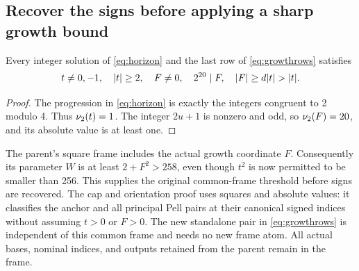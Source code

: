 \subsection{Recover the signs before applying a sharp growth bound}

\begin{lemma}\label{lem:preliminary}
Every integer solution of \eqref{eq:horizon} and the last row of
\eqref{eq:growthrows} satisfies
\[
 t\ne0,-1,\quad \lvert t\rvert\ge2,\quad F\ne0,\quad
 2^{20}\mid F,\quad \lvert F\rvert\ge d\lvert t\rvert>\lvert t\rvert.
\]
\end{lemma}
\begin{proof}
The progression in \eqref{eq:horizon} is exactly the integers congruent to
2 modulo 4. Thus \(\nu_2(t)=1\). The integer \(2u+1\) is nonzero and
odd, so \(\nu_2(F)=20\), and its absolute value is at least one.
\end{proof}

The parent's square frame includes the actual growth coordinate \(F\).
Consequently its parameter \(W\) is at least \(2+F^2>258\), even though
\(t^2\) is now permitted to be smaller than 256. This supplies the
original common-frame threshold before signs are recovered. The cap and
orientation proof uses squares and absolute values: it classifies the
anchor and all principal Pell pairs at their canonical signed indices
without assuming \(t>0\) or \(F>0\). The new standalone pair in
\eqref{eq:growthrows} is independent of this common frame and needs no
new frame atom. All actual bases, nominal indices, and outputs retained
from the parent remain in the frame.

